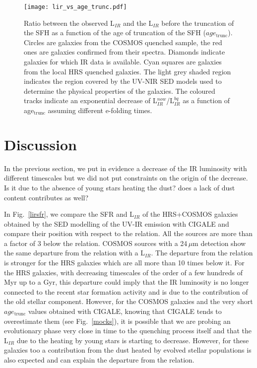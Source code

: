 \documentclass[traditabstract]{aa} %
\begin{document}
\begin{figure}[!h] 
  	\texttt{[image: lir\_vs\_age\_trunc.pdf]}
  	\caption{\label{lir_vs_agetrunc_all} Ratio between the observed L$_{IR}$ and the L$_{IR}$ before the truncation of the SFH as a function of the age of truncation of the SFH ($age_{\mathrm{trunc}}$). Circles are galaxies from the COSMOS quenched sample, the red ones are galaxies confirmed from their spectra. Diamonds indicate galaxies for which IR data is available. Cyan squares are galaxies from the local HRS quenched galaxies. The light grey shaded region indicates the region covered by the UV-NIR SED models used to determine the physical properties of the galaxies. The coloured tracks indicate an exponential decrease of L$_{IR}^{now}$/L$_{IR}^{bq}$ as a function of age$_{\mathrm{trunc}}$ assuming different e-folding times.}
\end{figure}

\section{\label{discussion}Discussion}

In the previous section, we put in evidence a decrease of the IR luminosity with different timescales but we did not put constraints on the origin of the decrease.
Is it due to the absence of young stars heating the dust? does a lack of dust content contributes as well?

In Fig.~\ref{lirsfr}, we compare the SFR and L$_{IR}$ of the HRS+COSMOS galaxies obtained by the SED modelling of the UV-IR emission with CIGALE and compare their position with respect to the \cite{KennicuttEvans12} relation.
All the sources are more than a factor of 3 below the relation.
COSMOS sources with a 24\,$\mu$m detection show the same departure from the \cite{KennicuttEvans12} relation with a L$_{IR}$.
The departure from the relation is stronger for the HRS galaxies which are all more than 10 times below it.
For the HRS galaxies, with decreasing timescales of the order of a few hundreds of Myr up to a Gyr, this departure could imply that the IR luminosity is no longer connected to the recent star formation activity and is due to the contribution of the old stellar component.
However, for the COSMOS galaxies and the very short $age_{\mathrm{trunc}}$ values obtained with CIGALE, knowing that CIGALE tends to overestimate them (see Fig.~\ref{mocks}), it is possible that we are probing an evolutionary phase very close in time to the quenching process itself and that the L$_{IR}$ due to the heating by young stars is starting to decrease.
However, for these galaxies too a contribution from the dust heated by evolved stellar populations is also expected and can explain the departure from the \cite{KennicuttEvans12} relation.
\end{document}
